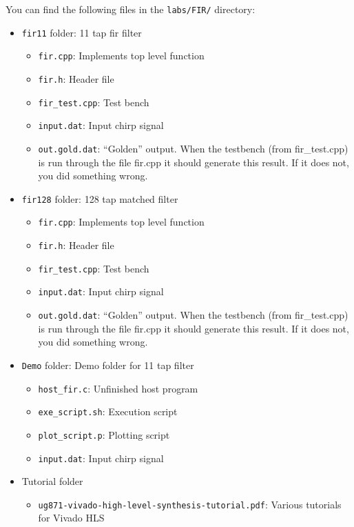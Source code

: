You can find the following files in the \texttt{labs/FIR/} directory:
\begin{itemize}
\item \texttt{fir11} folder: 11 tap fir filter
\begin{itemize}
\item \texttt{fir.cpp}: Implements top level function
\item \texttt{fir.h}: Header file
\item \texttt{fir\_test.cpp}: Test bench
\item \texttt{input.dat}: Input chirp signal
\item \texttt{out.gold.dat}: ``Golden'' output. When the testbench (from fir\_test.cpp) is run through the file fir.cpp it should generate this result. If it does not, you did something wrong.
\end{itemize}
\item \texttt{fir128} folder: 128 tap matched filter
\begin{itemize}
\item \texttt{fir.cpp}: Implements top level function
\item \texttt{fir.h}: Header file
\item \texttt{fir\_test.cpp}: Test bench
\item \texttt{input.dat}: Input chirp signal
\item \texttt{out.gold.dat}: ``Golden'' output. When the testbench (from fir\_test.cpp) is run through the file fir.cpp it should generate this result. If it does not, you did something wrong.
\end{itemize}
\item \texttt{Demo} folder: Demo folder for 11 tap filter
\begin{itemize}
\item \texttt{host\_fir.c}: Unfinished host program
\item \texttt{exe\_script.sh}: Execution script
\item \texttt{plot\_script.p}: Plotting script
\item \texttt{input.dat}: Input chirp signal
\end{itemize}
\item Tutorial folder
\begin{itemize}
\item \texttt{ug871-vivado-high-level-synthesis-tutorial.pdf}: Various tutorials for Vivado HLS
\end{itemize}
\end{itemize}

